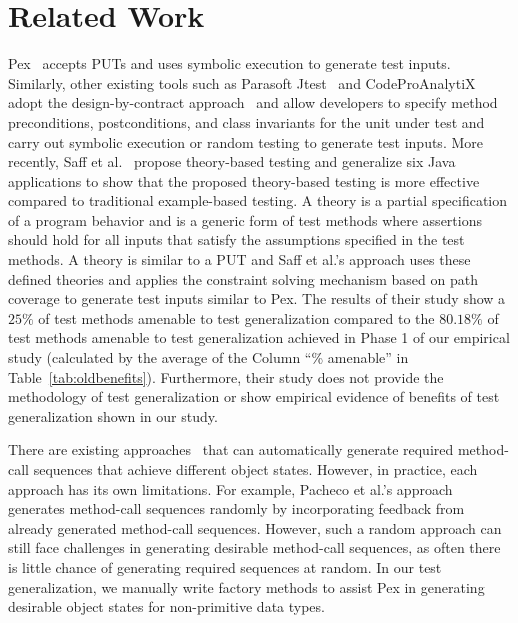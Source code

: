 \section{Related Work}
\label{sec:related}
\vspace*{2ex}
Pex~\cite{tillmann08:pex, tillmann05:parameterized, tillmann06:unit} accepts PUTs and uses symbolic execution to generate test inputs. Similarly, other existing tools such as Parasoft Jtest~\cite{jtest} and CodeProAnalytiX~\cite{codepro} adopt the design-by-contract approach~\cite{dbc} and allow developers to specify method preconditions, postconditions, and class invariants for the unit under test and carry out symbolic execution or random testing to generate test inputs. More recently, Saff et al.~\cite{ernst:theory} propose theory-based testing and generalize six Java applications to show that the proposed theory-based testing is more effective compared to traditional example-based testing. A theory is a partial specification of a program behavior and is a generic form of test methods where assertions should hold for all inputs that satisfy the assumptions specified in the test methods. A theory is similar to a PUT and Saff et al.'s approach uses these defined theories and applies the constraint solving mechanism based on path coverage to generate test inputs similar to Pex. The results of their study show a $25\%$ of test methods amenable to test generalization compared to the $80.18\%$ of test methods amenable to test generalization achieved in Phase 1 of our empirical study (calculated by the average of the Column ``\% amenable'' in Table~\ref{tab:oldbenefits}). Furthermore, their study does not provide the methodology of test generalization or show empirical evidence of benefits of test generalization shown in our study. 

There are existing approaches~\cite{pacheco:feedback, csallner:jcrasher, khurshid:symbolic} that can automatically generate required method-call sequences that achieve different object states. However, in practice, each approach has its own limitations. For example, Pacheco et al.'s approach~\cite{pacheco:feedback} generates method-call sequences randomly by incorporating feedback from already generated method-call sequences. However, such a random approach can still face challenges in generating desirable method-call sequences, as often there is little chance of generating required sequences at random. In our test generalization, we manually write factory methods to assist Pex in generating desirable object states for non-primitive data types.


